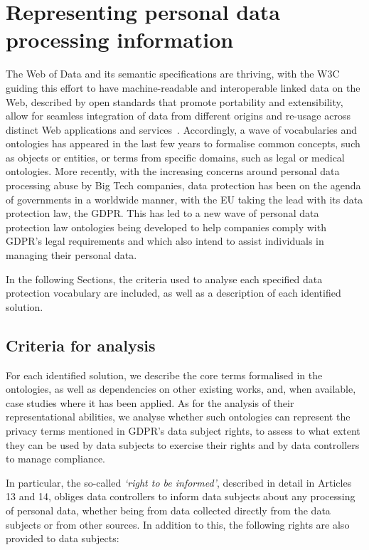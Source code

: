 \section{Representing personal data processing information}
\label{sec:sota_vocabularies}

The Web of Data and its semantic specifications are thriving, with the W3C guiding this effort to have machine-readable and interoperable linked data on the Web, described by open standards that promote portability and extensibility, allow for seamless integration of data from different origins and re-usage across distinct Web applications and services~\citep{berners-lee_semantic_2001}.
Accordingly, a wave of vocabularies and ontologies has appeared in the last few years to formalise common concepts, such as objects or entities, or terms from specific domains, such as legal or medical ontologies.
More recently, with the increasing concerns around personal data processing abuse by Big Tech companies, data protection has been on the agenda of governments in a worldwide manner, with the EU taking the lead with its data protection law, the GDPR.
This has led to a new wave of personal data protection law ontologies being developed to help companies comply with GDPR's legal requirements and which also intend to assist individuals in managing their personal data.

In the following Sections, the criteria used to analyse each specified data protection vocabulary are included, as well as a description of each identified solution.

\subsection{Criteria for analysis}
\label{sec:sota_vocabularies_criteria}

For each identified solution, we describe the core terms formalised in the ontologies, as well as dependencies on other existing works, and, when available, case studies where it has been applied.
As for the analysis of their representational abilities, we analyse whether such ontologies can represent the privacy terms mentioned in GDPR's data subject rights, to assess to what extent they can be used by data subjects to exercise their rights and by data controllers to manage compliance.

In particular, the so-called \textit{`right to be informed'}, described in detail in Articles 13 and 14, obliges data controllers to inform data subjects about any processing of personal data, whether being from data collected directly from the data subjects or from other sources. In addition to this, the following rights are also provided to data subjects:

